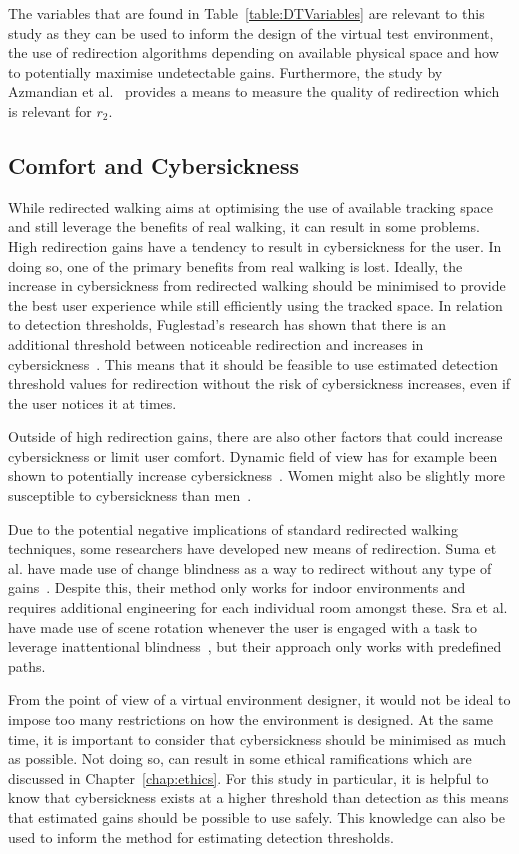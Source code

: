 The variables that are found in Table~\ref{table:DTVariables} are relevant to this study as they can be used to inform the design of the virtual test environment, the use of redirection algorithms depending on available physical space and how to potentially maximise undetectable gains. Furthermore, the study by Azmandian et al.~\cite{azmandian2015physical} provides a means to measure the quality of redirection which is relevant for $r_2$.

\subsection{Comfort and Cybersickness}
While redirected walking aims at optimising the use of available tracking space and still leverage the benefits of real walking, it can result in some problems. High redirection gains have a tendency to result in cybersickness for the user. In doing so, one of the primary benefits from real walking is lost. Ideally, the increase in cybersickness from redirected walking should be minimised to provide the best user experience while still efficiently using the tracked space. In relation to detection thresholds, Fuglestad's research has shown that there is an additional threshold between noticeable redirection and increases in cybersickness~\cite{fuglestad2018redirected}. This means that it should be feasible to use estimated detection threshold values for redirection without the risk of cybersickness increases, even if the user notices it at times.

Outside of high redirection gains, there are also other factors that could increase cybersickness or limit user comfort. Dynamic field of view has for example been shown to potentially increase cybersickness~\cite{norouzi2018assessing}. Women might also be slightly more susceptible to cybersickness than men~\cite{hildebrandt2018get}.

Due to the potential negative implications of standard redirected walking techniques, some researchers have developed new means of redirection. Suma et al. have made use of change blindness as a way to redirect without any type of gains~\cite{suma2011leveraging}. Despite this, their method only works for indoor environments and requires additional engineering for each individual room amongst these. Sra et al. have made use of scene rotation whenever the user is engaged with a task to leverage inattentional blindness~\cite{sra2018vmotion}, but their approach only works with predefined paths. 

From the point of view of a virtual environment designer, it would not be ideal to impose too many restrictions on how the environment is designed. At the same time, it is important to consider that cybersickness should be minimised as much as possible. Not doing so, can result in some ethical ramifications which are discussed in Chapter~\ref{chap:ethics}. For this study in particular, it is helpful to know that cybersickness exists at a higher threshold than detection as this means that estimated gains should be possible to use safely. This knowledge can also be used to inform the method for estimating detection thresholds. 

